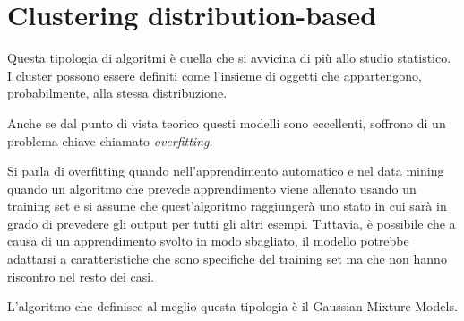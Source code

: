 \section{Clustering distribution-based}
	Questa tipologia di algoritmi è quella che si avvicina di più allo studio statistico. I cluster possono essere definiti come l'insieme di oggetti che appartengono, probabilmente, alla stessa distribuzione\cite{distribution-based_clustering}.

	Anche  se dal punto di vista teorico questi modelli sono eccellenti, soffrono di un problema chiave chiamato \emph{overfitting}. 

	Si parla di overfitting quando nell'apprendimento automatico e nel data mining quando un algoritmo che prevede apprendimento viene allenato usando un training set e si assume che quest'algoritmo raggiungerà uno stato in cui sarà in grado di prevedere gli output per tutti gli altri esempi. Tuttavia, è possibile che a causa di un apprendimento svolto in modo sbagliato, il modello potrebbe adattarsi a caratteristiche che sono specifiche del training set ma che non hanno riscontro nel resto dei casi\cite{overfitting}.

	L'algoritmo che definisce al meglio questa tipologia è il Gaussian Mixture Models.
